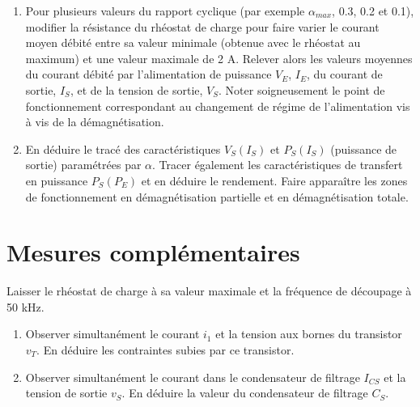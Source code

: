 \begin{enumerate}
\item Pour plusieurs valeurs du rapport cyclique (par exemple $\alpha_{max}$, 0.3, 0.2 et 0.1), modifier la résistance du rhéostat de charge pour faire varier le courant moyen débité entre sa valeur minimale (obtenue avec le rhéostat au maximum) et une valeur maximale de 2 A. Relever alors les valeurs moyennes du courant débité par l’alimentation de puissance $V_E$, $I_E$, du courant de sortie, $I_S$, et de la tension de sortie, $V_S$. Noter soigneusement le point de fonctionnement correspondant au changement de régime de l’alimentation vis à vis de la démagnétisation.
\item En déduire le tracé des caractéristiques $V_S(I_S)$ et $P_S(I_S)$ (puissance de sortie) paramétrées par $\alpha$. Tracer également les caractéristiques de transfert en puissance $P_S(P_E)$ et en déduire le rendement. Faire apparaître les zones de fonctionnement en démagnétisation partielle et en démagnétisation totale.

\end{enumerate}

\section{Mesures complémentaires}

Laisser le rhéostat de charge à sa valeur maximale et la fréquence de découpage à 50 kHz.

\begin{enumerate}
\item Observer simultanément le courant $i_1$ et la tension aux bornes du transistor $v_T$. En déduire les contraintes subies par ce transistor.%
\item Observer simultanément le courant dans le condensateur de filtrage $I_{CS}$ et la tension de sortie $v_S$. En déduire la valeur du condensateur de filtrage $C_S$.
\end{enumerate}
